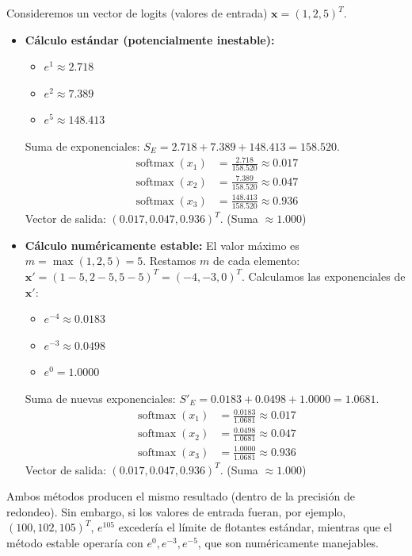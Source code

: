 \begin{example}[Estabilidad de Softmax con $K=3$]

Consideremos un vector de logits (valores de entrada) $\mathbf{x} = (1, 2, 5)^T$.
\begin{itemize}
    \item \textbf{Cálculo estándar (potencialmente inestable):}
    \begin{itemize}
        \item $e^1 \approx 2.718$
        \item $e^2 \approx 7.389$
        \item $e^5 \approx 148.413$
    \end{itemize}
    Suma de exponenciales: $S_E = 2.718 + 7.389 + 148.413 = 158.520$.
    \begin{align*}
        \operatorname{softmax}(x_1) &= \frac{2.718}{158.520} \approx 0.017 \\
        \operatorname{softmax}(x_2) &= \frac{7.389}{158.520} \approx 0.047 \\
        \operatorname{softmax}(x_3) &= \frac{148.413}{158.520} \approx 0.936
    \end{align*}
    Vector de salida: $(0.017, 0.047, 0.936)^T$. (Suma $\approx 1.000$)

    \item \textbf{Cálculo numéricamente estable:}
    El valor máximo es $m = \max(1, 2, 5) = 5$.
    Restamos $m$ de cada elemento: $\mathbf{x'} = (1-5, 2-5, 5-5)^T = (-4, -3, 0)^T$.
    Calculamos las exponenciales de $\mathbf{x'}$:
    \begin{itemize}
        \item $e^{-4} \approx 0.0183$
        \item $e^{-3} \approx 0.0498$
        \item $e^0 = 1.0000$
    \end{itemize}
    Suma de nuevas exponenciales: $S'_E = 0.0183 + 0.0498 + 1.0000 = 1.0681$.
    \begin{align*}
        \operatorname{softmax}(x_1) &= \frac{0.0183}{1.0681} \approx 0.017 \\
        \operatorname{softmax}(x_2) &= \frac{0.0498}{1.0681} \approx 0.047 \\
        \operatorname{softmax}(x_3) &= \frac{1.0000}{1.0681} \approx 0.936
    \end{align*}
    Vector de salida: $(0.017, 0.047, 0.936)^T$. (Suma $\approx 1.000$)
\end{itemize}
\end{example}
Ambos métodos producen el mismo resultado (dentro de la precisión de redondeo). Sin embargo, si los valores de entrada fueran, por ejemplo, $(100, 102, 105)^T$, $e^{105}$ excedería el límite de flotantes estándar, mientras que el método estable operaría con $e^0, e^{-3}, e^{-5}$, que son numéricamente manejables.



